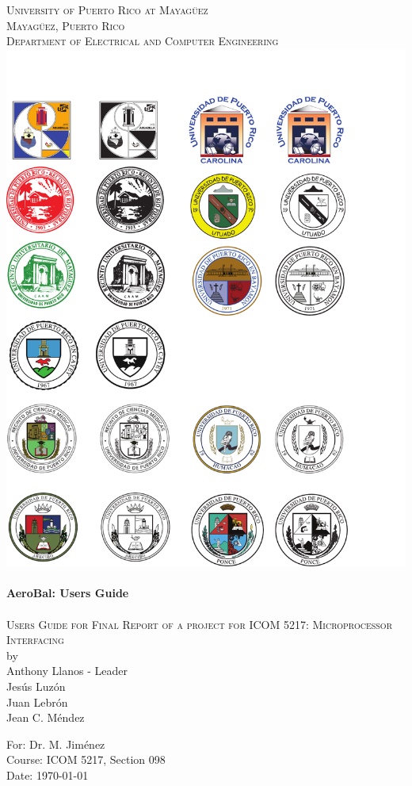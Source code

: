 \begin{titlepage}

\begin{center}

    
\textsc{\large University of Puerto Rico at Mayag\"{u}ez}\\[0.5cm]
\textsc{\large Mayag\"{u}ez, Puerto Rico}\\[0.5cm]
\textsc{\normalsize Department of Electrical and Computer Engineering}\\[1.5cm]
\includegraphics[scale=1.25]{res/logo_rum}\\[1cm]

\HRule \\[0.5cm]
{ \huge \bfseries AeroBal: Users Guide}\\[0.2cm]
\HRule \\[0.5cm]
\textsc{Users Guide for Final Report of a project for ICOM 5217: Microprocessor Interfacing}\\[0.5cm]

by \\[0.5cm]

Anthony Llanos - Leader \\
Jes\'{u}s Luz\'{o}n \\
Juan Lebr\'{o}n \\
Jean C. M\'{e}ndez  \\

\vfill

For: Dr. M. Jim\'{e}nez \\
Course: ICOM 5217, Section 098 \\
Date: \today

\end{center}

\end{titlepage}
